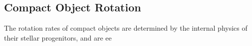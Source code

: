 {\color{orange}

\subsection{Compact Object Rotation}

The rotation rates of compact objects are determined by the internal physics of their stellar progenitors, and are ee

}
